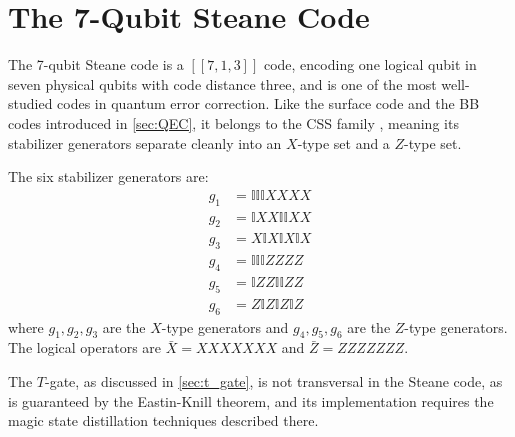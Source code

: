 \section{The 7-Qubit Steane Code}
The 7-qubit Steane code \cite{Steane1996, eczoo_steane} is a $[[7, 1, 3]]$ code, encoding one logical qubit in seven physical qubits with code distance three, and is one of the most well-studied codes in quantum error correction. Like the surface code and the BB codes introduced in \cref{sec:QEC}, it belongs to the CSS family \cite{Nielsen_Chuang_2010}, meaning its stabilizer generators separate cleanly into an $X$-type set and a $Z$-type set.

The six stabilizer generators are:
\begin{align*}
g_1 &= \mathbb{I}\mathbb{I}\mathbb{I} X X X X \\
g_2 &= \mathbb{I} X X \mathbb{I}\mathbb{I} X X \\
g_3 &= X \mathbb{I} X \mathbb{I} X \mathbb{I} X \\
g_4 &= \mathbb{I}\mathbb{I}\mathbb{I} Z Z Z Z \\
g_5 &= \mathbb{I} Z Z \mathbb{I}\mathbb{I} Z Z \\
g_6 &= Z \mathbb{I} Z \mathbb{I} Z \mathbb{I} Z
\end{align*}
where $g_1, g_2, g_3$ are the $X$-type generators and $g_4, g_5, g_6$ are the $Z$-type generators. The logical operators are $\bar{X} = XXXXXXX$ and $\bar{Z} = ZZZZZZZ$.

The $T$-gate, as discussed in \cref{sec:t_gate}, is not transversal in the Steane code, as is guaranteed by the Eastin-Knill theorem, and its implementation requires the magic state distillation techniques described there.